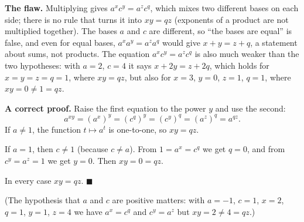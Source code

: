 \textbf{The flaw.} Multiplying gives $a^xc^y=a^zc^q$, which mixes two different bases on each side; there is no rule that turns it into $xy=qz$ (exponents of a product are not multiplied together). The bases $a$ and $c$ are different, so ``the bases are equal'' is false, and even for equal bases, $a^xa^y=a^za^q$ would give $x+y=z+q$, a statement about sums, not products. The equation $a^xc^y=a^zc^q$ is also much weaker than the two hypotheses: with $a=2$, $c=4$ it says $x+2y=z+2q$, which holds for $x=y=z=q=1$, where $xy=qz$, but also for $x=3$, $y=0$, $z=1$, $q=1$, where $xy=0\ne1=qz$.

\textbf{A correct proof.} Raise the first equation to the power $y$ and use the second:
\[
a^{xy}=(a^x)^y=(c^q)^y=(c^y)^q=(a^z)^q=a^{qz}.
\]
If $a\ne1$, the function $t\mapsto a^t$ is one-to-one, so $xy=qz$.

If $a=1$, then $c\ne1$ (because $c\ne a$). From $1=a^x=c^q$ we get $q=0$, and from $c^y=a^z=1$ we get $y=0$. Then $xy=0=qz$.

In every case $xy=qz$. $\blacksquare$

(The hypothesis that $a$ and $c$ are positive matters: with $a=-1$, $c=1$, $x=2$, $q=1$, $y=1$, $z=4$ we have $a^x=c^q$ and $c^y=a^z$ but $xy=2\ne4=qz$.)
